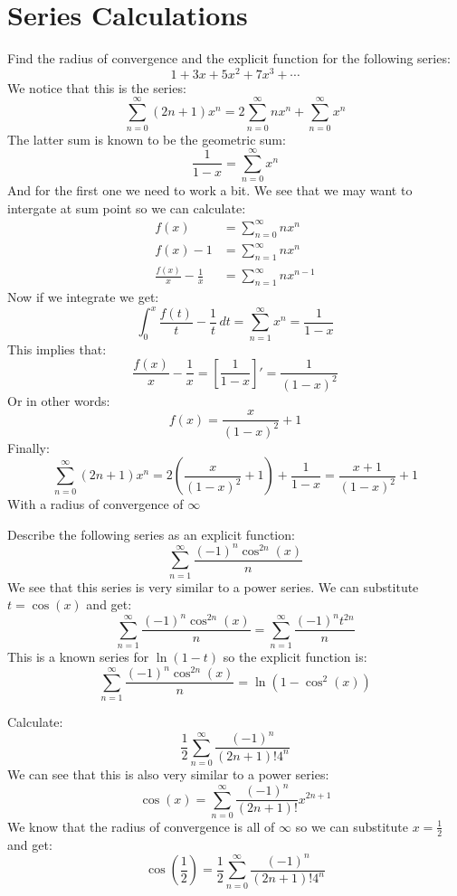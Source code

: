 \documentclass{article}
\theoremstyle{plain}
\begin{document}
	\newpage
	
	\section{Series Calculations}
	Find the radius of convergence and the explicit function for the 
	following series:
	\[
		1 + 3x + 5x^2 + 7x^3 + \cdots
	\]
	We notice that this is the series:
	\[
		\sum_{n=0}^{\infty}{(2n+1)x^n} = 
		2\sum_{n=0}^{\infty}{nx^n} + 
		\sum_{n=0}^{\infty}{x^n}
	\]
	The latter sum is known to be the geometric sum:
	\[
		\frac{1}{1-x} = \sum_{n=0}^{\infty}{x^n}
	\]
	And for the first one we need to work a bit. We see that we may want
	to intergate at sum point so we can calculate:
	\begin{align*}
		f(x) &= \sum_{n=0}^{\infty}{nx^n} \\
		f(x) - 1 &= \sum_{n=1}^{\infty}{nx^n} \\
		\frac{f(x)}{x} - \frac{1}{x} &= \sum_{n=1}^{\infty}{nx^{n-1}}
	\end{align*}
	Now if we integrate we get:
	\[
		\int_{0}^{x}{\frac{f(t)}{t} - \frac{1}{t}\,dt} = 
		\sum_{n=1}^{\infty}{x^{n}} =
		\frac{1}{1-x}
	\]
	This implies that:
	\[
		\frac{f(x)}{x} - \frac{1}{x} = \left[\frac{1}{1-x}\right]' = 
		\dfrac{1}{\left(1-x\right)^2}
	\]
	Or in other words:
	\[
		f(x) = \dfrac{x}{\left(1-x\right)^2} + 1
	\]
	Finally:
	\[
		\sum_{n=0}^{\infty}{(2n+1)x^n} = 
		2\left(\dfrac{x}{\left(1-x\right)^2} + 1\right) + \frac{1}{1-x} = 
		\frac{x+1}{(1-x)^2} + 1
	\]
	With a radius of convergence of $\infty$
	
	\newpage
	
	Describe the following series as an explicit function:
	\[
		\sum_{n=1}^{\infty}{\frac{(-1)^n\cos^{2n}(x)}{n}}
	\]
	We see that this series is very similar to a power series. We can
	substitute $t = \cos(x)$ and get:
	\[
		\sum_{n=1}^{\infty}{\frac{(-1)^n\cos^{2n}(x)}{n}} = 
		\sum_{n=1}^{\infty}{\frac{(-1)^n t^{2n}}{n}}
	\]
	This is a known series for $\ln(1-t)$ so the explicit function is:
	\[
		\sum_{n=1}^{\infty}{\frac{(-1)^n\cos^{2n}(x)}{n}} = 
		\ln(1-\cos^2(x))
	\]
	
	\newpage
	Calculate: 
	\[
		\frac{1}{2}\sum_{n=0}^{\infty}{\frac{(-1)^n}{(2n+1)! 4^n}}
	\]
	We can see that this is also very similar to a power series:
	\[
		\cos(x) = \sum_{n=0}^{\infty}{\frac{(-1)^n}{(2n+1)!}x^{2n+1}}
	\]
	We know that the radius of convergence is all of $\infty$ so we
	can substitute $x = \frac 12$ and get:
	\[
		\cos\left(\frac 12\right) = 
		\frac{1}{2}\sum_{n=0}^{\infty}{\frac{(-1)^n}{(2n+1)! 4^n}}
	\]
	
\end{document}
